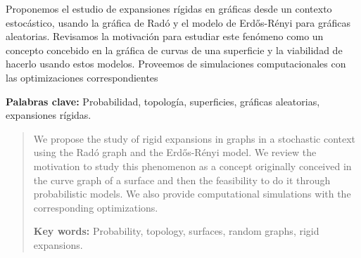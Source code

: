 \documentclass[11pt, a4paper, doubleside]{Thesis}
\begin{document}
\pagestyle{fancy} %

\tableofcontents %




\begin{Resumen}

Proponemos el estudio de expansiones rígidas en gráficas desde un contexto estocástico, usando la gráfica de Radó y el modelo de Erdős-Rényi para gráficas aleatorias. Revisamos la motivación para estudiar este fenómeno como un concepto concebido en la gráfica de curvas de una superficie y la viabilidad de hacerlo usando estos modelos. Proveemos de simulaciones computacionales con las optimizaciones correspondientes

\textbf{Palabras clave:} Probabilidad, topología, superficies, gráficas aleatorias, expansiones rígidas. 
\end{Resumen}


\begin{abstract}

We propose the study of rigid expansions in graphs in a stochastic context using the Radó graph and the Erdős-Rényi model. We review the motivation to study this phenomenon as a concept originally conceived in the curve graph of a surface and then the feasibility to do it through probabilistic models. We also provide computational simulations with the corresponding optimizations.

\textbf{Key words:} Probability, topology, surfaces, random graphs, rigid expansions.
\end{abstract}
\end{document}

